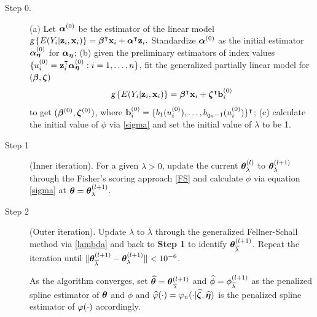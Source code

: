 \begin{description}%
	\item [Step 0.] (a) Let $\bm\alpha^{(0)}$ be the estimator of the linear model 
	$
	\textsl{g}\left\{E(Y_i|\mathbf{z}_i,\mathbf{x}_i)\right\}=\bm\beta^\intercal\mathbf{x}_i + \bm\alpha^\intercal\mathbf{z}_i.
	$
	Standardize $\bm\alpha^{(0)}$ as the initial estimator $\bm\alpha_{\bm\eta}^{(0)}$ for $\bm\alpha_{\bm\eta}$; (b) given the preliminary estimators of index values 
	$\{u_i^{(0)} =  \mathbf{z}_i^\intercal\bm\alpha_{\bm\eta}^{(0)}: i = 1,\ldots,n\}$, fit the generalized partially linear model for $(\bm\beta,\bm\zeta)$ 
	$$
	\textsl{g}\left\{E(Y_i|\mathbf{z}_i,\mathbf{x}_i)\right\}=\bm\beta^\intercal\mathbf{x}_i + \bm\zeta^\intercal\mathbf{b}_i^{(0)}	 
	$$
	to get $(\bm\beta^{(0)},\bm\zeta^{(0)})$, where $\mathbf{b}_i^{(0)} =\{b_1(u_i^{(0)}),\ldots,b_{q_n-1}(u_i^{(0)})\}^\intercal$; (c) calculate the initial value of $\phi$ via \eqref{sigma} and set the initial value of $\lambda$ to be 1. %
	\item [Step 1] (Inner iteration). For a given $\lambda>0$, update the current $\bm\theta^{(l)}_\lambda$ to $\bm\theta^{(l+1)}_\lambda$ through the Fisher's scoring approach \eqref{FS} and calculate $\phi$ via equation \eqref{sigma} at $\bm\theta = \bm\theta^{(l+1)}_\lambda$. 
	\item [Step 2] (Outer iteration). Update $\lambda$ to $\overline\lambda$ through the generalized Fellner-Schall method via \eqref{lambda} and back to \textbf{Step 1} to identify $\bm\theta_{\overline\lambda}^{(l+1)}$.   
	Repeat the iteration until $\|\bm\theta_{\overline\lambda}^{(l+1)}-\bm\theta_\lambda^{(l+1)}\|< 10^{-6}$. 
	
	As the algorithm converges, set $\widehat{\bm\theta} = \bm\theta_{\displaystyle\over\lambda}^{(l+1)}$ and $\widehat\phi = \phi_{\overline\lambda}^{(l+1)}$ as the penalized spline estimator of $\bm\theta$ and $\phi$ and $\widehat{\varphi}(\cdot) = \varphi_n(\cdot|\widehat{\bm\zeta},\widehat{\bm\eta})$ is the penalized spline estimator of $\varphi(\cdot)$ accordingly. %
\end{description}


